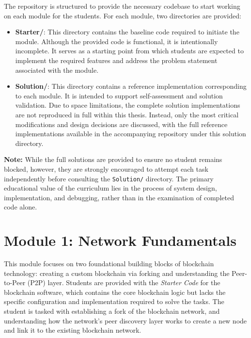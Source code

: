 The repository is structured to provide the necessary codebase to start working on each module for the students. For each module, two directories are provided:
\begin{itemize}
    \item \textbf{Starter/}: This directory contains the baseline code required to initiate the module. Although the provided code is functional, it is intentionally incomplete. It serves as a starting point from which students are expected to implement the required features and address the problem statement associated with the module.

    \item \textbf{Solution/}: This directory contains a reference implementation corresponding to each module. It is intended to support self-assessment and solution validation. Due to space limitations, the complete solution implementations are not reproduced in full within this thesis. Instead, only the most critical modifications and design decisions are discussed, with the full reference implementations available in the accompanying repository under this solution directory.
\end{itemize}

\textbf{Note:} While the full solutions are provided to ensure no student remains blocked, however, they are strongly encouraged to attempt each task independently before consulting the \texttt{Solution/} directory. The primary educational value of the curriculum lies in the process of system design, implementation, and debugging, rather than in the examination of completed code alone.

\newpage

\section{Module 1: Network Fundamentals} \label{ch5_module1}

This module focuses on two foundational building blocks of blockchain technology: creating a custom blockchain via forking and understanding the Peer-to-Peer (P2P) layer. Students are provided with the \textit{Starter Code} for the blockchain software, which contains the core blockchain logic but lacks the specific configuration and implementation required to solve the tasks. The student is tasked with establishing a fork of the blockchain network, and understanding how the network's peer discovery layer works to create a new node and link it to the existing blockchain network.

